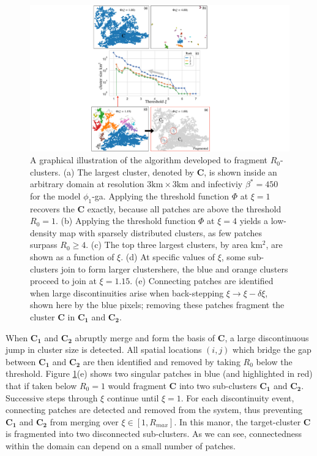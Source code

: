 \begin{figure}
    \centering
    \includegraphics[scale=0.5]{chapter7/figures/figure1-frag-method.pdf}
    \caption{A graphical illustration of the algorithm developed to fragment $R_0$-clusters. 
    (a) The largest cluster, denoted by $\mathbf{C}$, is shown inside an arbitrary domain at resolution $3\mathrm{km} \times 3 \mathrm{km}$ and infectiviy $\beta^*=450$ for the model $\phi_1$-ga.
    Applying the threshold function $\Phi$ at $\xi=1$ recovers the $\mathbf{C}$ exactly, because all patches are above the threshold $R_0=1$.
    (b) Applying the threshold function $\Phi$ at $\xi=4$ yields a low-density map with sparsely distributed clusters, as few patches surpass $R_0\geq 4$. 
    (c) The top three largest clusters, by area $\mathrm{km^2}$, are shown as a function of $\xi$.
    (d) At specific values of $\xi$, some sub-clusters join to form larger clusters\textemdash here, the blue and orange clusters proceed to join at $\xi = 1.15$.
    (e) Connecting patches are identified when large discontinuities arise when back-stepping $\xi \rightarrow \xi -\delta \xi$, shown here by the blue pixels; removing these patches fragment the cluster $\mathbf{C}$ in $\mathbf{C_1}$ and $\mathbf{C_2}$. 
    }
    \label{fig:R0-threshold-function}
\end{figure}

When $\mathbf{C_1}$ and $\mathbf{C_2}$ abruptly merge and form the basis of $\mathbf{C}$, a large discontinuous jump in cluster size is detected. 
All spatial locations $(i,j)$ which bridge the gap between $\mathbf{C_1}$ and $\mathbf{C_2}$ are then identified and removed by taking $R_0$ below the threshold.
Figure \ref{fig:R0-threshold-function}(e) shows two singular patches in blue (and highlighted in red) that if taken below $R_0=1$ would fragment $\mathbf{C}$ into two sub-clusters $\mathbf{C_1}$ and $\mathbf{C_2}$.
Successive steps through $\xi$ continue until $\xi=1$.
For each discontinuity event, connecting patches are detected and removed from the system,
thus preventing $\mathbf{C_1}$ and $\mathbf{C_2}$ from merging over $\xi \in [1, R_{max}]$.
In this manor, the target-cluster $\mathbf{C}$ is fragmented into two disconnected sub-clusters. 
As we can see, connectedness within the domain can depend on a small number of patches.


